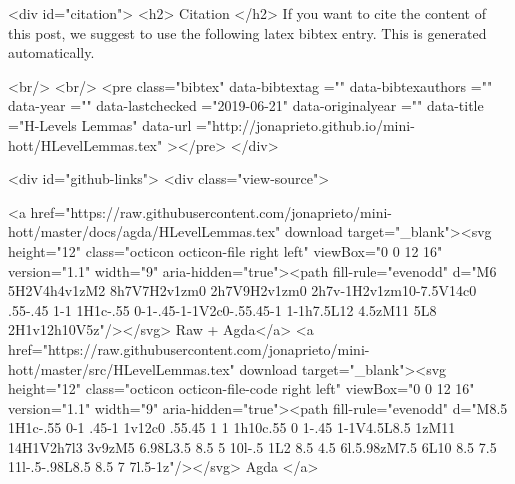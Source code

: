   
  <div id="citation">
  <h2> Citation </h2>
  If you want to cite the content of this post,
  we suggest to use the following latex bibtex entry.
  This is generated automatically.

  <br/>
  <br/>
  <pre class="bibtex"
       data-bibtextag =""
       data-bibtexauthors =""
       data-year =""
       data-lastchecked ="2019-06-21"
       data-originalyear =""
       data-title ="H-Levels Lemmas"
       data-url ="http://jonaprieto.github.io/mini-hott/HLevelLemmas.tex"
  ></pre>
  </div>
  

  <div id="github-links">
    <div class="view-source">
      
        <a href="https://raw.githubusercontent.com/jonaprieto/mini-hott/master/docs/agda/HLevelLemmas.tex" download target="_blank"><svg height="12" class="octicon octicon-file right left" viewBox="0 0 12 16" version="1.1" width="9" aria-hidden="true"><path fill-rule="evenodd" d="M6 5H2V4h4v1zM2 8h7V7H2v1zm0 2h7V9H2v1zm0 2h7v-1H2v1zm10-7.5V14c0 .55-.45 1-1 1H1c-.55 0-1-.45-1-1V2c0-.55.45-1 1-1h7.5L12 4.5zM11 5L8 2H1v12h10V5z"/></svg> Raw + Agda</a>
        <a href="https://raw.githubusercontent.com/jonaprieto/mini-hott/master/src/HLevelLemmas.tex" download target="_blank"><svg height="12" class="octicon octicon-file-code right left" viewBox="0 0 12 16" version="1.1" width="9" aria-hidden="true"><path fill-rule="evenodd" d="M8.5 1H1c-.55 0-1 .45-1 1v12c0 .55.45 1 1 1h10c.55 0 1-.45 1-1V4.5L8.5 1zM11 14H1V2h7l3 3v9zM5 6.98L3.5 8.5 5 10l-.5 1L2 8.5 4.5 6l.5.98zM7.5 6L10 8.5 7.5 11l-.5-.98L8.5 8.5 7 7l.5-1z"/></svg> Agda </a>
      
